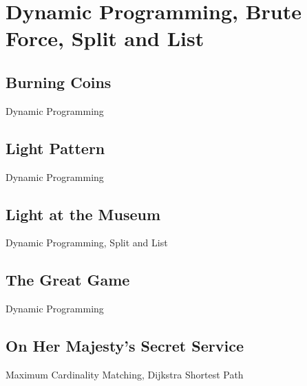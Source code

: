 \documentclass[10pt,a4paper,twoside]{report}
\begin{document}
\section{Dynamic Programming, Brute Force, Split and List}

\subsection*{Burning Coins}
\begin{keywords}Dynamic Programming\end{keywords}


\newpage
\subsection*{Light Pattern}
\begin{keywords}Dynamic Programming\end{keywords}


\newpage
\subsection*{Light at the Museum}
\begin{keywords}Dynamic Programming, Split and List\end{keywords}


\newpage
\subsection*{The Great Game}
\begin{keywords}Dynamic Programming\end{keywords}


\newpage
\subsection*{On Her Majesty's Secret Service}
\begin{keywords}Maximum Cardinality Matching, Dijkstra Shortest Path\end{keywords}

\end{document}
